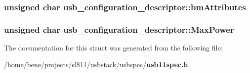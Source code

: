 \subsubsection{\setlength{\rightskip}{0pt plus 5cm}unsigned char {\bf usb\_\-configuration\_\-descriptor::bm\-Attributes}}\label{structusb__configuration__descriptor_646522fb53b9d0d69c8e4f70376a69b1}


\subsubsection{\setlength{\rightskip}{0pt plus 5cm}unsigned char {\bf usb\_\-configuration\_\-descriptor::Max\-Power}}\label{structusb__configuration__descriptor_05fd1a2a47a39f4fcdc89f1258331fdc}




The documentation for this struct was generated from the following file:\begin{CompactItemize}
\item 
/home/bene/projects/sl811/usbstack/usbspec/{\bf usb11spec.h}\end{CompactItemize}
